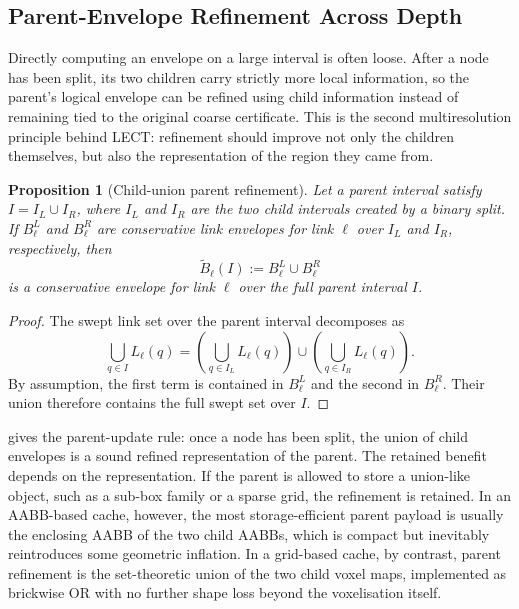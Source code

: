\documentclass[journal]{IEEEtran}
\newtheorem{proposition}{Proposition}
\begin{document}
\subsection{Parent-Envelope Refinement Across Depth}
\label{sec:lect_parent_refine}

Directly computing an envelope on a large interval is often loose. After a node
has been split, its two children carry strictly more local information, so the
parent's logical envelope can be refined using child information instead of
remaining tied to the original coarse certificate. This is the second
multiresolution principle behind LECT: refinement should improve not only the
children themselves, but also the representation of the region they came from.

\begin{proposition}[Child-union parent refinement]
\label{prop:parent_union}
Let a parent interval satisfy $I = I_L \cup I_R$, where $I_L$ and $I_R$ are the
two child intervals created by a binary split. If $B_\ell^L$ and $B_\ell^R$ are
conservative link envelopes for link $\ell$ over $I_L$ and $I_R$, respectively,
then
\[
\widetilde{B}_\ell(I) := B_\ell^L \cup B_\ell^R
\]
is a conservative envelope for link $\ell$ over the full parent interval $I$.
\end{proposition}

\begin{proof}
The swept link set over the parent interval decomposes as
\[
\bigcup_{q\in I} L_\ell(q)
= \left(\bigcup_{q\in I_L} L_\ell(q)\right)
\cup
\left(\bigcup_{q\in I_R} L_\ell(q)\right).
\]
By assumption, the first term is contained in $B_\ell^L$ and the second in
$B_\ell^R$. Their union therefore contains the full swept set over $I$.
\end{proof}

 gives the parent-update rule: once a node has
been split, the union of child envelopes is a sound refined representation of
the parent. The retained benefit depends on the representation.
If the parent is allowed to store a union-like object, such as a sub-box family
or a sparse grid, the refinement is retained. In an AABB-based cache, however,
the most storage-efficient parent payload is usually the enclosing AABB of the
two child AABBs, which is compact but inevitably reintroduces some geometric
inflation. In a grid-based cache, by contrast, parent refinement is the
set-theoretic union of the two child voxel maps, implemented as brickwise OR
with no further shape loss beyond the voxelisation itself.
\end{document}
